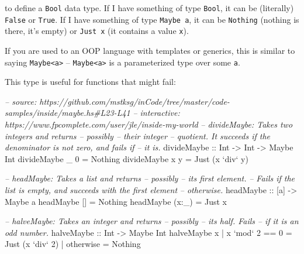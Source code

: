 \documentclass[]{article}
\newenvironment{Shaded}{}{}
\newcommand{\DataTypeTok}[1]{\textcolor[rgb]{0.56,0.13,0.00}{#1}}
\newcommand{\DecValTok}[1]{\textcolor[rgb]{0.25,0.63,0.44}{#1}}
\newcommand{\CommentTok}[1]{\textcolor[rgb]{0.38,0.63,0.69}{\textit{#1}}}
\newcommand{\OtherTok}[1]{\textcolor[rgb]{0.00,0.44,0.13}{#1}}
\newcommand{\FunctionTok}[1]{\textcolor[rgb]{0.02,0.16,0.49}{#1}}
\newcommand{\NormalTok}[1]{#1}
\begin{document}
to define a \texttt{Bool} data type. If I have something of type \texttt{Bool},
it can be (literally) \texttt{False} or \texttt{True}. If I have something of
type \texttt{Maybe\ a}, it can be \texttt{Nothing} (nothing is there, it's
empty) or \texttt{Just\ x} (it contains a value \texttt{x}).

If you are used to an OOP language with templates or generics, this is similar
to saying \texttt{Maybe\textless{}a\textgreater{}} --
\texttt{Maybe\textless{}a\textgreater{}} is a parameterized type over some
\texttt{a}.

This type is useful for functions that might fail:

\begin{Shaded}
\begin{Highlighting}[]
\CommentTok{-- source: https://github.com/mstksg/inCode/tree/master/code-samples/inside/maybe.hs#L23-L41}
\CommentTok{-- interactive: https://www.fpcomplete.com/user/jle/inside-my-world}
\CommentTok{-- divideMaybe: Takes two integers and returns -- possibly -- their integer}
\CommentTok{--      quotient. It succeeds if the denominator is not zero, and fails if}
\CommentTok{--      it is.}
\OtherTok{divideMaybe ::} \DataTypeTok{Int} \OtherTok{->} \DataTypeTok{Int} \OtherTok{->} \DataTypeTok{Maybe} \DataTypeTok{Int}
\NormalTok{divideMaybe _ }\DecValTok{0} \FunctionTok{=} \DataTypeTok{Nothing}
\NormalTok{divideMaybe x y }\FunctionTok{=} \DataTypeTok{Just}\NormalTok{ (x }\OtherTok{`div`}\NormalTok{ y)}

\CommentTok{-- headMaybe: Takes a list and returns -- possibly -- its first element.}
\CommentTok{--      Fails if the list is empty, and succeeds with the first element}
\CommentTok{--      otherwise.}
\OtherTok{headMaybe ::}\NormalTok{ [a] }\OtherTok{->} \DataTypeTok{Maybe}\NormalTok{ a}
\NormalTok{headMaybe []    }\FunctionTok{=} \DataTypeTok{Nothing}
\NormalTok{headMaybe (x}\FunctionTok{:}\NormalTok{_) }\FunctionTok{=} \DataTypeTok{Just}\NormalTok{ x}

\CommentTok{-- halveMaybe: Takes an integer and returns -- possibly -- its half.  Fails}
\CommentTok{--      if it is an odd number.}
\OtherTok{halveMaybe ::} \DataTypeTok{Int} \OtherTok{->} \DataTypeTok{Maybe} \DataTypeTok{Int}
\NormalTok{halveMaybe x }\FunctionTok{|}\NormalTok{ x }\OtherTok{`mod`} \DecValTok{2} \FunctionTok{==} \DecValTok{0} \FunctionTok{=} \DataTypeTok{Just}\NormalTok{ (x }\OtherTok{`div`} \DecValTok{2}\NormalTok{)}
             \FunctionTok{|}\NormalTok{ otherwise      }\FunctionTok{=} \DataTypeTok{Nothing}
\end{Highlighting}
\end{Shaded}
\end{document}
